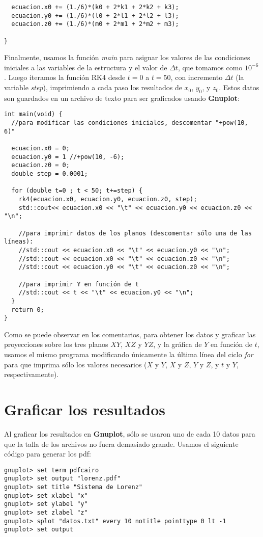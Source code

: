 \documentclass[letterpaper, 12pt]{article}
\begin{document}
{\begin{lstlisting}
  ecuacion.x0 += (1./6)*(k0 + 2*k1 + 2*k2 + k3);
  ecuacion.y0 += (1./6)*(l0 + 2*l1 + 2*l2 + l3);
  ecuacion.z0 += (1./6)*(m0 + 2*m1 + 2*m2 + m3);
 
}
\end{lstlisting}

Finalmente, usamos la funci\'on \textit{main} para asignar los valores de las condiciones iniciales a las variables de la estructura y el valor de $\Delta t$, que tomamos como $10^{-6}$. Luego iteramos la funci\'on RK4 desde $t = 0$ a $t = 50$, con incremento $\Delta t$ (la variable \textit{step}), imprimiendo a cada paso los resultados de $x_0$, $y_0$, y $z_0$. Estos datos son guardados en un archivo de texto para ser graficados usando \textbf{Gnuplot}:
\begin{lstlisting}
int main(void) {
  //para modificar las condiciones iniciales, descomentar "+pow(10, 6)"
  
  ecuacion.x0 = 0;
  ecuacion.y0 = 1 //+pow(10, -6);
  ecuacion.z0 = 0;
  double step = 0.0001;
  
  for (double t=0 ; t < 50; t+=step) {
    rk4(ecuacion.x0, ecuacion.y0, ecuacion.z0, step);
    std::cout<< ecuacion.x0 << "\t" << ecuacion.y0 << ecuacion.z0 << "\n";

    //para imprimir datos de los planos (descomentar sólo una de las líneas):
    //std::cout << ecuacion.x0 << "\t" << ecuacion.y0 << "\n";
    //std::cout << ecuacion.x0 << "\t" << ecuacion.z0 << "\n";
    //std::cout << ecuacion.y0 << "\t" << ecuacion.z0 << "\n";

    //para imprimir Y en función de t
    //std::cout << t << "\t" << ecuacion.y0 << "\n"; 
  }  
  return 0;
}
\end{lstlisting}

Como se puede observar en los comentarios, para obtener los datos y graficar las proyecciones sobre los tres planos $XY$, $XZ$ y $YZ$, y la gr\'afica de $Y$ en funci\'on de $t$, usamos el mismo programa modificando \'unicamente la \'ultima l\'inea del ciclo \textit{for} para que imprima s\'olo los valores necesarios ($X$ y $Y$, $X$ y $Z$, $Y$ y $Z$, y $t$ y $Y$, respectivamente).


\section*{Graficar los resultados}

\justify
Al graficar los resultados en \textbf{Gnuplot}, s\'olo se usaron uno de cada 10 datos para que la talla de los archivos no fuera demasiado grande. Usamos el siguiente c\'odigo para generar los pdf:
\lstset{language =}
\begin{lstlisting}
gnuplot> set term pdfcairo
gnuplot> set output "lorenz.pdf"
gnuplot> set title "Sistema de Lorenz"
gnuplot> set xlabel "x"
gnuplot> set ylabel "y"
gnuplot> set zlabel "z"
gnuplot> splot "datos.txt" every 10 notitle pointtype 0 lt -1
gnuplot> set output
\end{lstlisting}

}
\end{document}
